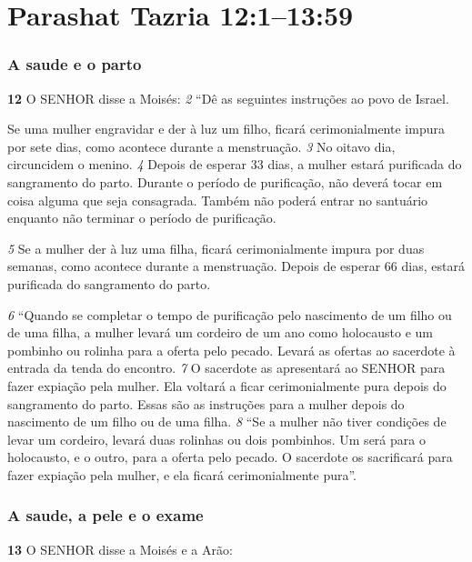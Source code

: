 \section*{Parashat Tazria 12:1–13:59}

\subsubsection*{A saude e o parto}
   
\textbf{\large 12}
 O SENHOR disse a Moisés: 
\textit{\tiny 2} 
“Dê as seguintes instruções ao povo de Israel. 

\smallskip
Se uma mulher engravidar e der à luz um filho, ficará cerimonialmente impura por
sete dias, como acontece durante a menstruação. 
\textit{\tiny 3} 
No oitavo dia, circuncidem o
menino. 
\textit{\tiny 4} 
Depois de esperar 33 dias, a mulher estará purificada do sangramento
do parto. Durante o período de purificação, não deverá tocar em coisa alguma que
seja consagrada. Também não poderá entrar no santuário enquanto não terminar
o período de purificação. 

\smallskip
\textit{\tiny 5} 
Se a mulher der à luz uma filha, ficará
cerimonialmente impura por duas semanas, como acontece durante a
menstruação. Depois de esperar 66 dias, estará purificada do sangramento do parto. 

\smallskip
\textit{\tiny 6} 
“Quando se completar o tempo de purificação pelo nascimento de um filho ou
de uma filha, a mulher levará um cordeiro de um ano como holocausto e um
pombinho ou rolinha para a oferta pelo pecado. Levará as ofertas ao sacerdote à
entrada da tenda do encontro. 
\textit{\tiny 7} 
O sacerdote as apresentará ao SENHOR para fazer
expiação pela mulher. Ela voltará a ficar cerimonialmente pura depois do
sangramento do parto. Essas são as instruções para a mulher depois do
nascimento de um filho ou de uma filha. 
\textit{\tiny 8} 
“Se a mulher não tiver condições de levar um cordeiro, levará duas rolinhas ou
dois pombinhos. Um será para o holocausto, e o outro, para a oferta pelo pecado.
O sacerdote os sacrificará para fazer expiação pela mulher, e ela ficará
cerimonialmente pura”.

  
\bigskip 
\subsubsection*{A saude, a pele e o exame}
\textbf{\large 13}
 O SENHOR disse a Moisés e a Arão: 

